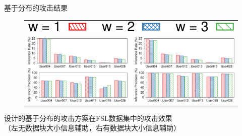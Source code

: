 \documentclass[aspectratio=43]{beamer}
\begin{document}
\begin{frame}{基于分布的攻击结果}
\begin{figure}[!htbp]
    \centering
    \begin{tabular}{p{.48\linewidth}p{.48\linewidth}}
        \multicolumn{2}{c}{\includegraphics[width=.35\textwidth]{img/legend-effectiveness.pdf}}  \\
        \includegraphics[width=\linewidth]{img/distribution-effectiveness-wo-size.pdf} &
        \includegraphics[width=\linewidth]{img/distribution-effectiveness-w-size.pdf}\\
    \end{tabular}
\end{figure}
\begin{card}
设计的基于分布的攻击方案在FSL数据集中的攻击效果\\[2mm]（左无数据块大小信息辅助，右有数据块大小信息辅助）
\end{card}  
\end{frame}
\end{document}
